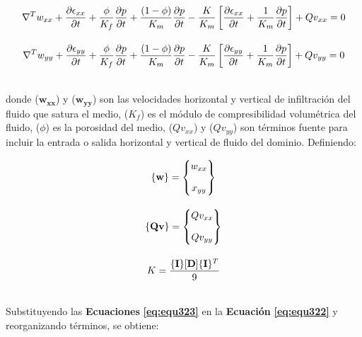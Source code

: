 \begin{ceqn} 
\begin{subequations} \label{eq:equ322} 
\begin{gather}
\normalsize{
\nabla^T w_{xx} + \frac{\partial \epsilon_{xx}}{\partial t} + \frac{\phi}{K_f}\frac{\partial p}{\partial t} + \frac{(1-\phi)}{K_m}\frac{\partial p}{\partial t} - \frac{K}{K_m}\left[\frac{\partial \epsilon_{xx}}{\partial t} + \frac{1}{K_m}\frac{\partial p}{\partial t}\right] + Qv_{xx}= 0
} \label{eq:equ322a}\\[10pt]
\normalsize{
\nabla^T w_{yy} + \frac{\partial \epsilon_{yy}}{\partial t} + \frac{\phi}{K_f}\frac{\partial p}{\partial t} + \frac{(1-\phi)}{K_m}\frac{\partial p}{\partial t} - \frac{K}{K_m}\left[\frac{\partial \epsilon_{yy}}{\partial t} + \frac{1}{K_m}\frac{\partial p}{\partial t}\right] + Qv_{yy}= 0
} \label{eq:equ322b}
\end{gather}  
\end{subequations} 
\end{ceqn}
\\
donde ($\mathbf{w_{xx}}$) y ($\mathbf{w_{yy}}$) son las velocidades horizontal y vertical de infiltración del fluido que satura el medio, ($K_f$) es el módulo de compresibilidad volumétrica del fluido, ($\phi$) es la porosidad del medio, ($Qv_{xx}$) y ($Qv_{yy}$) son términos fuente para incluir la entrada o salida horizontal y vertical de fluido del dominio. Definiendo:

\begin{ceqn} 
\begin{subequations} \label{eq:equ323} 
\begin{gather}
\normalsize{\{\mathbf{w}\} = \begin{Bmatrix} w_{xx}\\[1em]x_{yy}\end{Bmatrix} } \label{eq:equ323a}\\[10pt]
\normalsize{\{\mathbf{Qv}\} = \begin{Bmatrix} Qv_{xx}\\[1em]Qv_{yy}\end{Bmatrix} } \label{eq:equ323b}\\[10pt]
\normalsize{K = \frac{\{\mathbf{I}\}[\mathbf{D}]\{\mathbf{I}\}^T}{9}}
\end{gather}  
\end{subequations} 
\end{ceqn}
\\
Substituyendo las \textbf{Ecuaciones} \textbf{\ref{eq:equ323}} en la \textbf{Ecuación} \textbf{\ref{eq:equ322}} y reorganizando términos, se obtiene:

